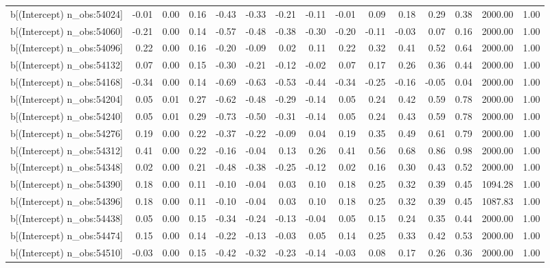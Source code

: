 \begin{table}[ht]
\begin{tabular}{rrrrrrrrrrrrrrr}
  b[(Intercept) n\_obs:54024] & -0.01 & 0.00 & 0.16 & -0.43 & -0.33 & -0.21 & -0.11 & -0.01 & 0.09 & 0.18 & 0.29 & 0.38 & 2000.00 & 1.00 \\ 
  b[(Intercept) n\_obs:54060] & -0.21 & 0.00 & 0.14 & -0.57 & -0.48 & -0.38 & -0.30 & -0.20 & -0.11 & -0.03 & 0.07 & 0.16 & 2000.00 & 1.00 \\ 
  b[(Intercept) n\_obs:54096] & 0.22 & 0.00 & 0.16 & -0.20 & -0.09 & 0.02 & 0.11 & 0.22 & 0.32 & 0.41 & 0.52 & 0.64 & 2000.00 & 1.00 \\ 
  b[(Intercept) n\_obs:54132] & 0.07 & 0.00 & 0.15 & -0.30 & -0.21 & -0.12 & -0.02 & 0.07 & 0.17 & 0.26 & 0.36 & 0.44 & 2000.00 & 1.00 \\ 
  b[(Intercept) n\_obs:54168] & -0.34 & 0.00 & 0.14 & -0.69 & -0.63 & -0.53 & -0.44 & -0.34 & -0.25 & -0.16 & -0.05 & 0.04 & 2000.00 & 1.00 \\ 
  b[(Intercept) n\_obs:54204] & 0.05 & 0.01 & 0.27 & -0.62 & -0.48 & -0.29 & -0.14 & 0.05 & 0.24 & 0.42 & 0.59 & 0.78 & 2000.00 & 1.00 \\ 
  b[(Intercept) n\_obs:54240] & 0.05 & 0.01 & 0.29 & -0.73 & -0.50 & -0.31 & -0.14 & 0.05 & 0.24 & 0.43 & 0.59 & 0.78 & 2000.00 & 1.00 \\ 
  b[(Intercept) n\_obs:54276] & 0.19 & 0.00 & 0.22 & -0.37 & -0.22 & -0.09 & 0.04 & 0.19 & 0.35 & 0.49 & 0.61 & 0.79 & 2000.00 & 1.00 \\ 
  b[(Intercept) n\_obs:54312] & 0.41 & 0.00 & 0.22 & -0.16 & -0.04 & 0.13 & 0.26 & 0.41 & 0.56 & 0.68 & 0.86 & 0.98 & 2000.00 & 1.00 \\ 
  b[(Intercept) n\_obs:54348] & 0.02 & 0.00 & 0.21 & -0.48 & -0.38 & -0.25 & -0.12 & 0.02 & 0.16 & 0.30 & 0.43 & 0.52 & 2000.00 & 1.00 \\ 
  b[(Intercept) n\_obs:54390] & 0.18 & 0.00 & 0.11 & -0.10 & -0.04 & 0.03 & 0.10 & 0.18 & 0.25 & 0.32 & 0.39 & 0.45 & 1094.28 & 1.00 \\ 
  b[(Intercept) n\_obs:54396] & 0.18 & 0.00 & 0.11 & -0.10 & -0.04 & 0.03 & 0.10 & 0.18 & 0.25 & 0.32 & 0.39 & 0.45 & 1087.83 & 1.00 \\ 
  b[(Intercept) n\_obs:54438] & 0.05 & 0.00 & 0.15 & -0.34 & -0.24 & -0.13 & -0.04 & 0.05 & 0.15 & 0.24 & 0.35 & 0.44 & 2000.00 & 1.00 \\ 
  b[(Intercept) n\_obs:54474] & 0.15 & 0.00 & 0.14 & -0.22 & -0.13 & -0.03 & 0.05 & 0.14 & 0.25 & 0.33 & 0.42 & 0.53 & 2000.00 & 1.00 \\ 
  b[(Intercept) n\_obs:54510] & -0.03 & 0.00 & 0.15 & -0.42 & -0.32 & -0.23 & -0.14 & -0.03 & 0.08 & 0.17 & 0.26 & 0.36 & 2000.00 & 1.00 \\ 

\end{tabular}
\end{table}
